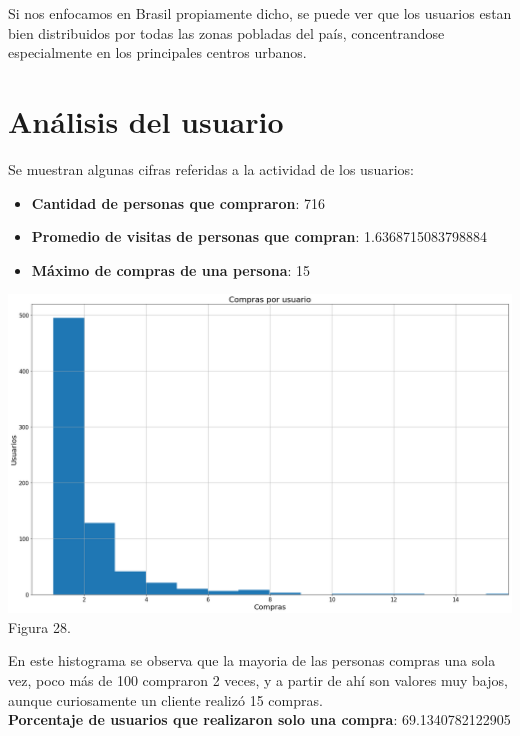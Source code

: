 \documentclass[a4paper ,12pt]{article}
\begin{document}
Si nos enfocamos en Brasil propiamente dicho, se puede ver que los usuarios estan bien distribuidos por todas las zonas pobladas del país, concentrandose especialmente en los principales centros urbanos.

\newpage
\section{Análisis del usuario}

Se muestran algunas cifras referidas a la actividad de los usuarios:\\

\begin{itemize}
	\item \textbf{Cantidad de personas que compraron}:
	716
	
	\item
\textbf{	Promedio de visitas de personas que compran}:
	1.6368715083798884
	
	\item
	\textbf{Máximo de compras de una persona}:
	15
\end{itemize}

\begin{center}
	\includegraphics[width=1.1\linewidth]{output_110_1}
	\\Figura 28.
	
\end{center}


En este histograma se observa que la mayoria de las personas compras una sola vez, poco más de 100 compraron 2 veces, y a partir de ahí son valores muy bajos, aunque curiosamente un cliente realizó 15 compras.\\

\textbf{Porcentaje de usuarios que realizaron solo una compra}:
69.1340782122905
\\
\end{document}
